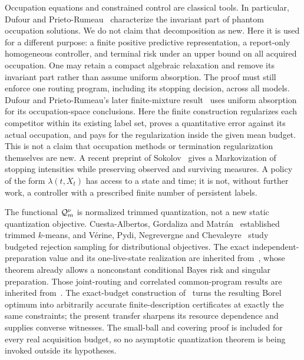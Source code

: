 Occupation equations and constrained control are classical tools. In particular, Dufour and Prieto-Rumeau~\cite{DPR} characterize the invariant part of phantom occupation solutions. We do not claim that decomposition as new. Here it is used for a different purpose: a finite positive predictive representation, a report-only homogeneous controller, and terminal risk under an upper bound on all acquired occupation. One may retain a compact algebraic relaxation and remove its invariant part rather than assume uniform absorption. The proof must still enforce one routing program, including its stopping decision, across all models. Dufour and Prieto-Rumeau's later finite-mixture result~\cite{DPRG} uses uniform absorption for its occupation-space conclusions. Here the finite construction regularizes each competitor within its existing label set, proves a quantitative error against its actual occupation, and pays for the regularization inside the given mean budget. This is not a claim that occupation methods or termination regularization themselves are new. A recent preprint of Sokolov~\cite{Sokolov} gives a Markovization of stopping intensities while preserving observed and surviving measures. A policy of the form $\lambda(t,X_t)$ has access to a state and time; it is not, without further work, a controller with a prescribed finite number of persistent labels.

The functional $\mathcal Q_m^\nu$ is normalized trimmed quantization, not a new static quantization objective. Cuesta-Albertos, Gordaliza and Matr\'an~\cite{CGM} established trimmed $k$-means, and V\'erine, Pydi, Negrevergne and Chevaleyre~\cite{VPNC} study budgeted rejection sampling for distributional objectives. The exact independent-preparation value and its one-live-state realization are inherited from~\cite{GTFStopped}, whose theorem already allows a nonconstant conditional Bayes risk and singular preparation. Those joint-routing and correlated common-program results are inherited from~\cite{GTFMean}. The exact-budget construction of~\cite{GTFExactBudget} turns the resulting Borel optimum into arbitrarily accurate finite-description certificates at exactly the same constraints; the present transfer sharpens its resource dependence and supplies converse witnesses. The small-ball and covering proof is included for every real acquisition budget, so no asymptotic quantization theorem is being invoked outside its hypotheses.

